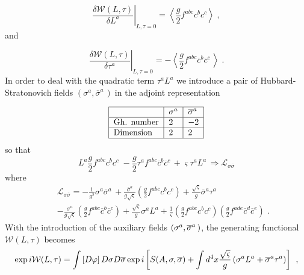 \documentclass[a4paper,12pt]{article}
\begin{document}
\begin{equation}
\left. \frac{\delta \mathcal{W}(L,\tau )}{\delta L^{a}}\right| _{L,\tau
=0}=\left\langle \frac{g}{2}f^{abc}c^{b}c^{c}\right\rangle \;,  \label{dl}
\end{equation}
and

\begin{equation}
\left. \frac{\delta \mathcal{W}(L,\tau )}{\delta \tau ^{a}}\right| _{L,\tau
=0}=-\left\langle \frac{g}{2}f^{abc}\overline{c}^{b}\overline{c}%
^{c}\,\right\rangle \;.  \label{dt}
\end{equation}
In order to deal with the quadratic term $\tau ^{a}L^{a}$ we introduce a
pair of Hubbard-Stratonovich fields $\left( \sigma ^{a},\overline{\sigma }%
^{a}\,\right) \;$in the adjoint representation

\begin{equation}
\begin{tabular}{|l|l|l|}
\hline
& $\sigma ^{a}$ & $\overline{\sigma }^{a}\,$ \\ \hline
Gh. number & $2$ & $-2$ \\ \hline
Dimension & $2$ & $2$ \\ \hline
\end{tabular}
\label{hb}
\end{equation}
so that
\begin{equation}
L^{a}\frac{g}{2}f^{abc}c^{b}c^{c}\;-\frac{g}{2}\tau ^{a}f^{abc}\overline{c}%
^{b}\overline{c}^{c}\,+\varsigma \tau ^{a}L^{a}\,\Rightarrow \mathcal{L}%
_{\sigma \overline{\sigma }}  \label{hsgh}
\end{equation}
where
\begin{eqnarray}
&&\mathcal{L}_{\sigma \overline{\sigma }}=-\frac{1}{g^{2}}\sigma ^{a}%
\overline{\sigma }^{a}\,+\frac{\overline{\sigma }^{a}}{g\sqrt{\varsigma }}%
\left( \frac{g}{2}f^{abc}c^{b}c^{c}\right) +\frac{\sqrt{\varsigma }}{g}%
\overline{\sigma }^{a}\tau ^{a}  \label{lss} \\
&&-\frac{\sigma ^{a}}{g\sqrt{\varsigma }}\left( \frac{g}{2}f^{abc}\overline{c%
}^{b}\overline{c}^{c}\right) +\frac{\sqrt{\varsigma }}{g}\sigma ^{a}L^{a}+%
\frac{1}{\varsigma }\left( \frac{g}{2}f^{abc}c^{b}c^{c}\right) \left( \frac{g%
}{2}f^{ade}\overline{c}^{d}\overline{c}^{e}\right) \;.  \nonumber
\end{eqnarray}
With the introduction of the auxiliary fields $\left( \sigma ^{a},\overline{%
\sigma }^{a}\,\right) $, the generating functional $\mathcal{W}(L,\tau )$
becomes
\begin{equation}
\exp i\mathcal{W}(L,\tau )=\int \left[ D\varphi \right] D\sigma D\overline{%
\sigma }\exp i\left[ S(A,\sigma ,\overline{\sigma })+\int d^{4}x\frac{\sqrt{%
\varsigma }}{g}\left( \sigma ^{a}L^{a}+\overline{\sigma }^{a}\tau
^{a}\right) \right] \,\;,  \label{wjs}
\end{equation}
\end{document}
